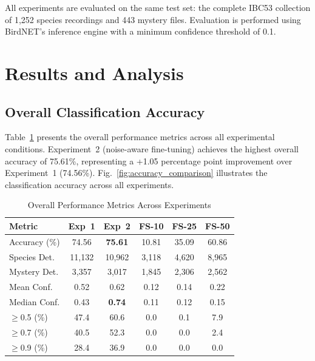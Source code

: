 \documentclass[conference]{IEEEtran}
\begin{document}
All experiments are evaluated on the same test set: the complete IBC53 collection of 1,252 species recordings and 443 mystery files. Evaluation is performed using BirdNET's inference engine with a minimum confidence threshold of 0.1.

\section{Results and Analysis}

\subsection{Overall Classification Accuracy}

Table~\ref{tab:overall} presents the overall performance metrics across all experimental conditions. Experiment~2 (noise-aware fine-tuning) achieves the highest overall accuracy of 75.61\%, representing a +1.05 percentage point improvement over Experiment~1 (74.56\%). Fig.~\ref{fig:accuracy_comparison} illustrates the classification accuracy across all experiments.

\begin{table}[htbp]
\caption{Overall Performance Metrics Across Experiments}
\label{tab:overall}
\centering
\begin{tabular}{lccccc}
\toprule
\textbf{Metric} & \textbf{Exp~1} & \textbf{Exp~2} & \textbf{FS-10} & \textbf{FS-25} & \textbf{FS-50} \\
\midrule
Accuracy (\%) & 74.56 & \textbf{75.61} & 10.81 & 35.09 & 60.86 \\
Species Det. & 11,132 & 10,962 & 3,118 & 4,620 & 8,965 \\
Mystery Det. & 3,357 & 3,017 & 1,845 & 2,306 & 2,562 \\
Mean Conf. & 0.52 & 0.62 & 0.12 & 0.14 & 0.22 \\
Median Conf. & 0.43 & \textbf{0.74} & 0.11 & 0.12 & 0.15 \\
$\geq$0.5 (\%) & 47.4 & 60.6 & 0.0 & 0.1 & 7.9 \\
$\geq$0.7 (\%) & 40.5 & 52.3 & 0.0 & 0.0 & 2.4 \\
$\geq$0.9 (\%) & 28.4 & 36.9 & 0.0 & 0.0 & 0.0 \\
\bottomrule
\end{tabular}
\end{table}
\end{document}
